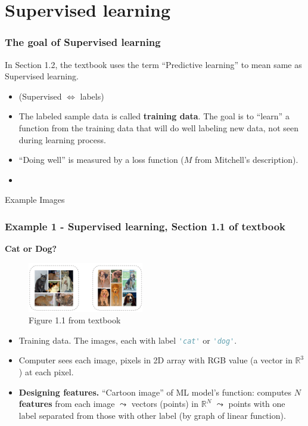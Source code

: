 \documentclass{beamer}
\theoremstyle{example}
\newcommand{\st}[1]{\lstinline[language=Python,basicstyle=\ttfamily,stringstyle=\small\color{strings}]!#1!}
\newcommand{\bb}[1]{\mathbb{#1}}
\begin{document}
\section{Supervised learning}

\begin{frame}
\frametitle{The goal of Supervised learning}
In Section 1.2, the textbook uses the term ``Predictive learning'' to mean same as Supervised learning. 
\begin{itemize}
    \item (Supervised $\iff$ labels) 
    \item The labeled sample data is called \textbf{training data}. The goal is to ``learn'' a function from the training data that will do well labeling new data, not seen during learning process. 
    \item ``Doing well'' is measured by a loss function ($M$ from Mitchell's description). 
    \item {}
\end{itemize}
\end{frame}

\begin{frame}[standout]
    Example Images
\end{frame}

\begin{frame}
\frametitle{Example 1 - Supervised learning, Section 1.1 of textbook}
\textbf{Cat or Dog?}

\begin{figure}
\includegraphics[width=0.45\textwidth]{../../Images/Fig1-1.png}
\caption*{Figure 1.1 from textbook}
\end{figure}

\begin{itemize}
    \item Training data. The images, each with label \st{'cat'} or \st{'dog'}.
    \item Computer sees each image, pixels in 2D array with RGB value (a vector in $\bb R^3$) at each pixel.
    \item \textbf{Designing features.} ``Cartoon image'' of ML model's function: computes $N$ \textbf{features} from each image $\leadsto$ vectors (points) in $\bb R^N$ $\leadsto$ points with one label separated from those with other label (by graph of linear function).
\end{itemize}
\end{frame}
\end{document}
